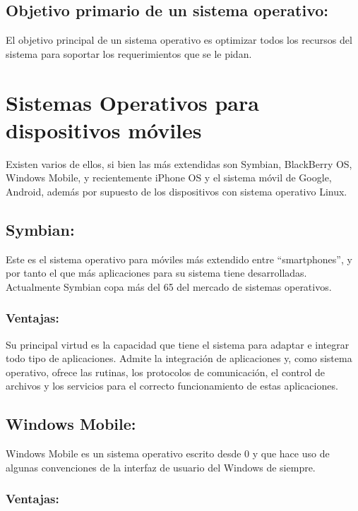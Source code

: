 \documentclass{bmcart}
\begin{document}
\subsection*{Objetivo primario de un sistema operativo:}

El objetivo principal de un sistema operativo es optimizar todos los recursos del sistema para soportar los requerimientos que se le pidan.


 
 
\section*{Sistemas Operativos para dispositivos móviles}
 
 Existen varios de ellos, si bien las más extendidas son Symbian, BlackBerry
 OS, Windows Mobile, y recientemente iPhone OS y el sistema móvil de Google,
 Android, además por supuesto de los dispositivos con sistema operativo Linux.

\subsection*{Symbian:}

Este es el sistema operativo para móviles más extendido entre “smartphones”, y por
tanto el que más aplicaciones para su sistema tiene desarrolladas. Actualmente
Symbian copa más del 65 del mercado de sistemas operativos.

\subsubsection*{Ventajas:}

Su principal virtud es la capacidad que tiene el sistema para adaptar e integrar todo
tipo de aplicaciones. Admite la integración de aplicaciones y, como sistema operativo,
ofrece las rutinas, los protocolos de comunicación, el control de archivos y los
servicios para el correcto funcionamiento de estas aplicaciones.

\subsection*{Windows Mobile:}

Windows Mobile es un sistema operativo escrito desde 0 y que hace uso de
algunas convenciones de la interfaz de usuario del Windows de siempre.

\subsubsection*{Ventajas:}
\end{document}

